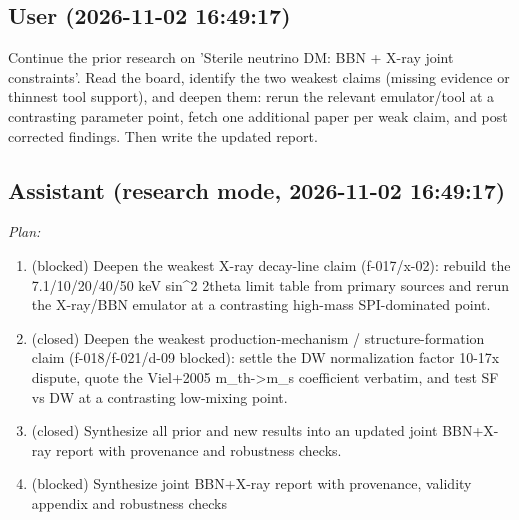 \documentclass[11pt,a4paper]{article}
\begin{document}
\subsection*{User \small(2026-11-02 16:49:17)}
Continue the prior research on 'Sterile neutrino DM: BBN + X-ray joint constraints'. Read the board, identify the two weakest claims (missing evidence or thinnest tool support), and deepen them: rerun the relevant emulator/tool at a contrasting parameter point, fetch one additional paper per weak claim, and post corrected findings. Then write the updated report.

\subsection*{Assistant \small(research mode, 2026-11-02 16:49:17)}
\textit{Plan:}\begin{enumerate}
  \item (blocked) Deepen the weakest X-ray decay-line claim (f-017/x-02): rebuild the 7.1/10/20/40/50 keV sin\textasciicircum{}2 2theta limit table from primary sources and rerun the X-ray/BBN emulator at a contrasting high-mass SPI-dominated point.
  \item (closed) Deepen the weakest production-mechanism / structure-formation claim (f-018/f-021/d-09 blocked): settle the DW normalization factor 10-17x dispute, quote the Viel+2005 m\_th-\textgreater{}m\_s coefficient verbatim, and test SF vs DW at a contrasting low-mixing point.
  \item (closed) Synthesize all prior and new results into an updated joint BBN+X-ray report with provenance and robustness checks.
  \item (blocked) Synthesize joint BBN+X-ray report with provenance, validity appendix and robustness checks
\end{enumerate}
\end{document}
